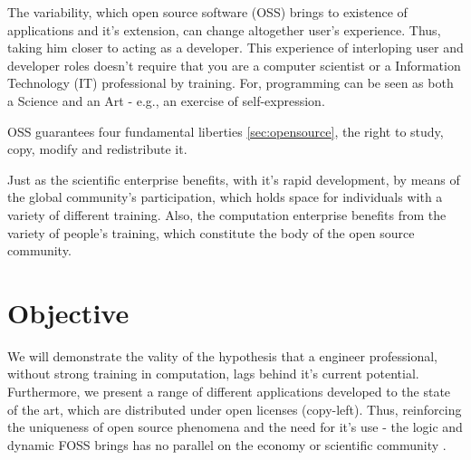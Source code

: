 \documentclass[
12pt,				%
openright,			%
oneside,			%
a4paper,			%
brazil,				%
english,			%
]{abntex2}
\begin{document}
The variability, which open source software (OSS) brings to existence of applications and it's extension, can change altogether user's experience. Thus, taking him closer to acting as a developer. This experience of interloping user and developer roles doesn't require that you are a computer scientist or a Information Technology (IT) professional by training. For, programming can be seen as both a Science and an Art \cite{knuth1968art} - e.g., an exercise of self-expression.

OSS guarantees four fundamental liberties \autoref{sec:opensource}, the right to study, copy, modify and redistribute it.

Just as the scientific enterprise benefits, with it's rapid development, by means of the global community's participation, which holds space for individuals with a variety of different training. Also, the computation enterprise benefits from the variety of people's training, which constitute the body of the open source community.
\section{Objective}

We will demonstrate the vality of the hypothesis that a engineer
professional, without strong training in computation, lags behind it's
current potential. Furthermore, we present a range of different
applications developed to the state of the art, which are distributed
under open licenses (copy-left). Thus, reinforcing the uniqueness of
open source phenomena and the need for it's use - the logic and
dynamic FOSS brings has no parallel on the economy or scientific
community \cite{hippel2003open,peters2009open}.
\end{document}
